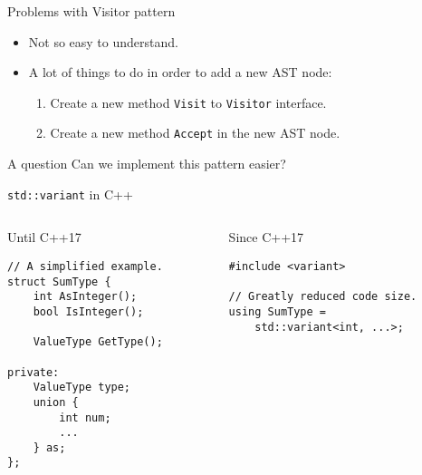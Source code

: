\documentclass{beamer}
\begin{document}
    \begin{frame}{Problems with Visitor pattern}
        \begin{itemize}
            \item Not so easy to understand.
            \item A lot of things to do in order to add a new AST node:
            \begin{enumerate}
                \item Create a new method \texttt{Visit} to \texttt{Visitor} interface.
                \item Create a new method \texttt{Accept} in the new AST node.
            \end{enumerate}
        \end{itemize}
        
        \vspace{30pt}
        
        \begin{block}{A question}
            Can we implement this pattern easier?
        \end{block}
    \end{frame}

    \begin{frame}[fragile]{\texttt{std::variant} in C++}

        \begin{columns}
            \begin{column}{0.45\textwidth}
\begin{block}{Until C++17}
\begin{verbatim}
// A simplified example.
struct SumType {
    int AsInteger();
    bool IsInteger();
    
    ValueType GetType();
    
private:
    ValueType type;
    union {
        int num;
        ...
    } as;
};
\end{verbatim}
\end{block}
            \end{column}

            \begin{column}{0.5\textwidth}
\begin{block}{Since C++17}
\begin{verbatim}
#include <variant>

// Greatly reduced code size.
using SumType =
    std::variant<int, ...>;
\end{verbatim}
\end{block}
            \end{column}
        \end{columns}
    \end{frame}
    
\end{document}
